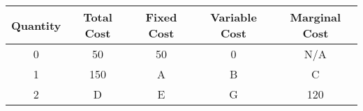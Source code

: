 \begin{table}[]
    \centering
    \begin{tabular}{c|c|c|c|c}
        Quantity& Total Cost & Fixed Cost & Variable Cost & Marginal Cost\\
        \hline
         0&50 & 50 & 0 & N/A\\
         1 & 150 & A & B & C\\
         2 & D & E & G & 120
    \end{tabular}
\end{table}